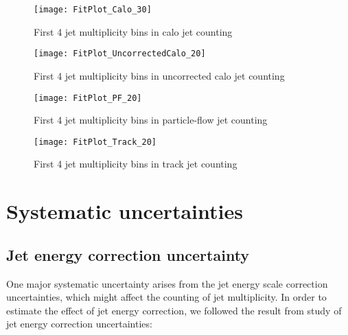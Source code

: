 \documentclass{cmspaper}
\begin{document}
\begin{figure}[hbtp]
   \begin{center} 
  \texttt{[image: FitPlot\_Calo\_30]}
   \caption{First 4 jet multiplicity bins in calo jet counting}
   \label{Figure_CaloJetFit}
   \end{center}
\end{figure}

\begin{figure}[hbtp]
   \begin{center} 
  \texttt{[image: FitPlot\_UncorrectedCalo\_20]}
   \caption{First 4 jet multiplicity bins in uncorrected calo jet counting}
   \label{Figure_UncorrectedCaloJetFit}
   \end{center}
\end{figure}

\begin{figure}[hbtp]
   \begin{center}
  \texttt{[image: FitPlot\_PF\_20]}
   \caption{First 4 jet multiplicity bins in particle-flow jet counting}
   \label{Figure_PFJetFit}
   \end{center}
\end{figure}

\begin{figure}[hbtp]
   \begin{center} 
  \texttt{[image: FitPlot\_Track\_20]}
   \caption{First 4 jet multiplicity bins in track jet counting}
   \label{Figure_TrackJetFit}
   \end{center}
\end{figure}

\section{Systematic uncertainties}


\subsection{Jet energy correction uncertainty}

One major systematic uncertainty arises from the jet energy scale
correction uncertainties, which might affect the counting of jet
multiplicity.  In order to estimate the effect of jet energy
correction, we followed the result from study of jet energy correction
uncertainties:
\end{document}
